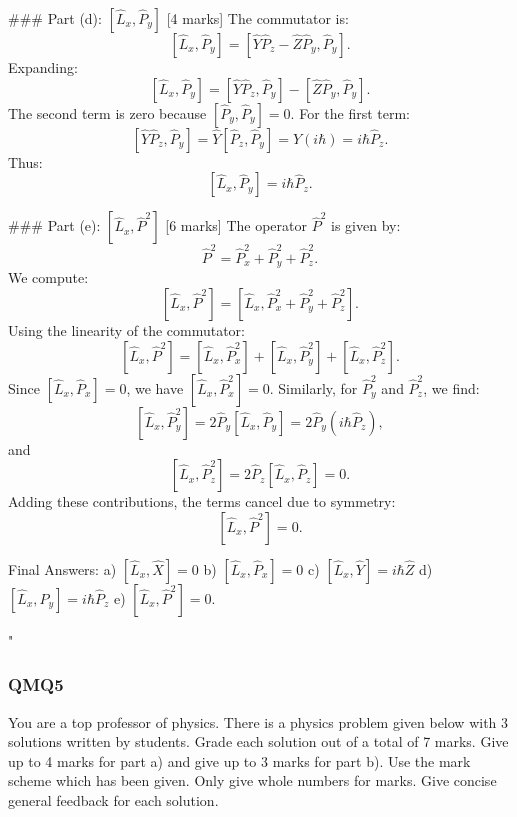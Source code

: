 ### Part (d): \(\left[\hat{L}_x, \hat{P}_y\right]\) [4 marks]
The commutator is:
\[
\left[\hat{L}_x, \hat{P}_y\right] = \left[\hat{Y}\hat{P}_z - \hat{Z}\hat{P}_y, \hat{P}_y\right].
\]
Expanding:
\[
\left[\hat{L}_x, \hat{P}_y\right] = \left[\hat{Y}\hat{P}_z, \hat{P}_y\right] - \left[\hat{Z}\hat{P}_y, \hat{P}_y\right].
\]
The second term is zero because \(\left[\hat{P}_y, \hat{P}_y\right] = 0\). For the first term:
\[
\left[\hat{Y}\hat{P}_z, \hat{P}_y\right] = \hat{Y}\left[\hat{P}_z, \hat{P}_y\right] = \hat{Y}(i\hbar) = i\hbar\hat{P}_z.
\]
Thus:
\[
\left[\hat{L}_x, \hat{P}_y\right] = i\hbar\hat{P}_z.
\]

### Part (e): \(\left[\hat{L}_x, \hat{P}^2\right]\) [6 marks]
The operator \(\hat{P}^2\) is given by:
\[
\hat{P}^2 = \hat{P}_x^2 + \hat{P}_y^2 + \hat{P}_z^2.
\]
We compute:
\[
\left[\hat{L}_x, \hat{P}^2\right] = \left[\hat{L}_x, \hat{P}_x^2 + \hat{P}_y^2 + \hat{P}_z^2\right].
\]
Using the linearity of the commutator:
\[
\left[\hat{L}_x, \hat{P}^2\right] = \left[\hat{L}_x, \hat{P}_x^2\right] + \left[\hat{L}_x, \hat{P}_y^2\right] + \left[\hat{L}_x, \hat{P}_z^2\right].
\]
Since \(\left[\hat{L}_x, \hat{P}_x\right] = 0\), we have \(\left[\hat{L}_x, \hat{P}_x^2\right] = 0\). Similarly, for \(\hat{P}_y^2\) and \(\hat{P}_z^2\), we find:
\[
\left[\hat{L}_x, \hat{P}_y^2\right] = 2\hat{P}_y\left[\hat{L}_x, \hat{P}_y\right] = 2\hat{P}_y(i\hbar\hat{P}_z),
\]
and
\[
\left[\hat{L}_x, \hat{P}_z^2\right] = 2\hat{P}_z\left[\hat{L}_x, \hat{P}_z\right] = 0.
\]
Adding these contributions, the terms cancel due to symmetry:
\[
\left[\hat{L}_x, \hat{P}^2\right] = 0.
\]

Final Answers:
a) \(\left[\hat{L}_x, \hat{X}\right] = 0\)  
b) \(\left[\hat{L}_x, \hat{P}_x\right] = 0\)  
c) \(\left[\hat{L}_x, \hat{Y}\right] = i\hbar\hat{Z}\)  
d) \(\left[\hat{L}_x, \hat{P}_y\right] = i\hbar\hat{P}_z\)  
e) \(\left[\hat{L}_x, \hat{P}^2\right] = 0\).


 
"

\subsubsection{QMQ5}

You are a top professor of physics. There is a physics problem given below with 3 solutions written by students. Grade each solution out of a total of 7 marks. Give up to 4 marks for part a) and give up to 3 marks for part b). Use the mark scheme which has been given. Only give whole numbers for marks. Give concise general feedback for each solution. 

